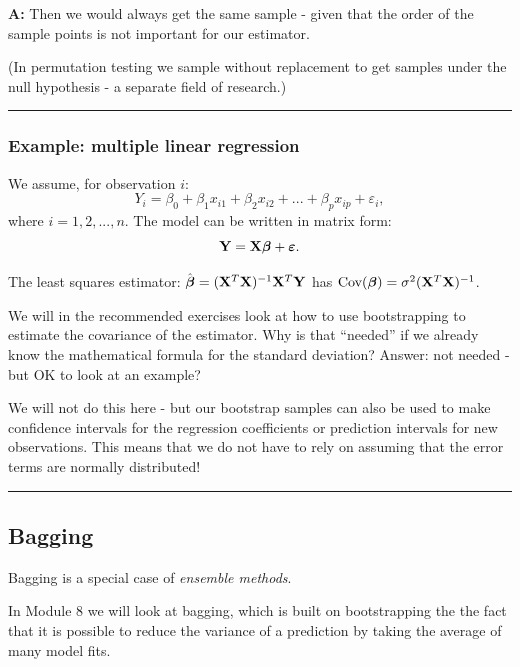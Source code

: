 \documentclass[]{article}
\begin{document}
\textbf{A:} Then we would always get the same sample - given that the
order of the sample points is not important for our estimator.

(In permutation testing we sample without replacement to get samples
under the null hypothesis - a separate field of research.)

\begin{center}\rule{0.5\linewidth}{\linethickness}\end{center}

\hypertarget{example-multiple-linear-regression}{%
\subsubsection{Example: multiple linear
regression}\label{example-multiple-linear-regression}}

We assume, for observation \(i\):
\[Y_i= \beta_0 + \beta_{1}  x_{i1} + \beta_2 x_{i2} + ... + \beta_p x_{ip} + \varepsilon_i,\]
where \(i=1,2,...,n\). The model can be written in matrix form:
\[{\bf Y}={\bf X} \boldsymbol{\beta}+{\boldsymbol{\varepsilon}}.\]

The least squares estimator:
\(\hat{\boldsymbol\beta}=({\bf X}^T{\bf X})^{-1} {\bf X}^T {\bf Y}\) has
\(\text{Cov}(\boldsymbol\beta)=\sigma^2({\bf X}^T{\bf X})^{-1}\).

We will in the recommended exercises look at how to use bootstrapping to
estimate the covariance of the estimator. Why is that ``needed'' if we
already know the mathematical formula for the standard deviation?
Answer: not needed - but OK to look at an example?

We will not do this here - but our bootstrap samples can also be used to
make confidence intervals for the regression coefficients or prediction
intervals for new observations. This means that we do not have to rely
on assuming that the error terms are normally distributed!

\begin{center}\rule{0.5\linewidth}{\linethickness}\end{center}

\hypertarget{bagging}{%
\subsection{Bagging}\label{bagging}}

Bagging is a special case of \emph{ensemble methods}.

In Module 8 we will look at bagging, which is built on bootstrapping the
the fact that it is possible to reduce the variance of a prediction by
taking the average of many model fits.
\end{document}
